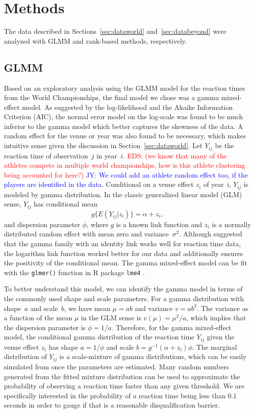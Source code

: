 \documentclass[12pt, letterpaper, titlepage]{article}
\newcommand{\jy}[1]{\textcolor{blue}{JY: #1}}
\newcommand{\eds}[1]{\textcolor{red}{EDS: (#1)}}
\begin{document}
\section{Methods} \label{sec:Methods}

The data described in Sections~\ref{sec:dataworld} and~\ref{sec:databeyond} were
analyzed with GLMM and rank-based methods, respectively.


\subsection{GLMM}\label{sec:glmm}
Based on an exploratory analysis using the GLMM model for the reaction times
from the World Championships, the final model we chose was a gamma mixed-effect 
model. As suggested by the log-likelihood and the Akaike Information
Criterion (AIC), the normal error model on the log-scale was found to be
much inferior to the gamma model which better captures the skewness of the
data. A random effect for the venue or year was also found to be necessary, 
which makes intuitive sense given the discussion in Section~\ref{sec:dataworld}. 
Let $Y_{ij}$ be the reaction time of observation~$j$ in year~$i$.
\eds{we know that many of the athletes compete in multiple world championships,
  how is this athlete clustering being accounted for here?}
\jy{We could add an athlete random effect too, if the players are identified in the data.}
Conditional on a venue effect $z_i$ of year~i,  $Y_{ij}$ is modeled by 
gamma distribution. In the classic generalized linear model (GLM) sense,
$Y_{ij}$ has conditional mean
\[
g\{E(Y_{ij} | z_i)\} = \alpha + z_i,
\]
and dispersion parameter $\phi$, where $g$ is a known link function and
$z_i$ is a normally distributed random effect with mean zero and
variance~$\sigma^2$. Although \citet{lo2015idlink} suggested that the gamma 
family with an identity link works well for reaction time data, the logarithm 
link function worked better for our data and additionally ensures the positivity
of the conditional mean. The gamma mixed-effect model can be fit with the 
\texttt{glmer()} function in R package \texttt{lme4} \citep{lme4}.


To better understand this model, we can identify the gamma model in terms of the
commonly used shape and scale parameters. For a gamma distribution with
shape~$a$ and scale~$b$, we have mean $\mu = ab$ and variance $v = ab^2$. The
variance as a function of the mean $\mu$ in the GLM sense is
$v(\mu) = \mu^2 / a$, which implies that the dispersion parameter is
$\phi = 1 / a$. Therefore, for the gamma mixed-effect model, the conditional
gamma distribution of the reaction time $Y_{ij}$ given the venue effect $z_i$
has shape $a = 1 / \phi$ and scale $b = g^{-1}(\alpha + z_i) \phi$. The marginal
distribution of $Y_{ij}$ is a scale-mixture of gamma distributions, which can be
easily simulated from once the parameters are estimated. Many
random numbers generated from the fitted mixture distribution can be used to
approximate the probability of observing a reaction time faster than any given
threshold.  We are specifically interested in the probability of a reaction time
 being less than 0.1 seconds in order to gauge if that is a reasonable 
disqualification barrier.
\end{document}
